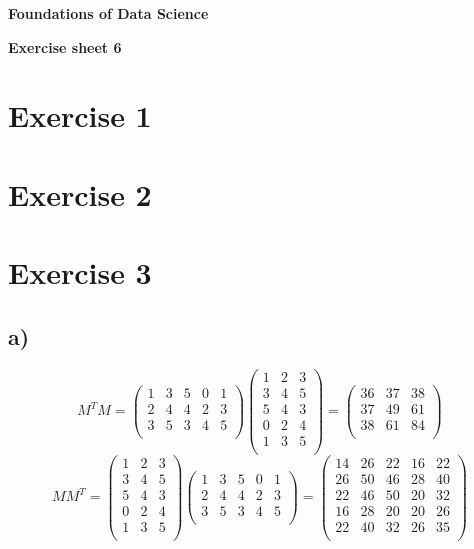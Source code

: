 \documentclass[a4paper,10pt]{article}
\begin{document}
\centerline{\Large\bfseries  Foundations of Data Science }
\centerline{\bfseries  Exercise sheet 6}
\section*{Exercise 1}
\section*{Exercise 2}
\section*{Exercise 3}
\subsection*{a)}

\[M^TM = \left( \begin{array}{ccccc}
1 & 3 & 5 & 0 & 1 \\
2 & 4 & 4 & 2 & 3 \\
3 & 5 & 3 & 4 & 5 \\
\end{array} \right)
%
\left( \begin{array}{ccccc}
1 & 2 & 3 \\
3 & 4 & 5 \\
5 & 4 & 3 \\
0 & 2 & 4 \\
1 & 3 & 5 \\
\end{array} \right)
=\left( \begin{array}{ccc}
36 & 37 & 38 \\
37 & 49 & 61 \\
38 & 61 & 84 \\
\end{array} \right)
\]
\[MM^T = 
\left( \begin{array}{ccccc}
1 & 2 & 3 \\
3 & 4 & 5 \\
5 & 4 & 3 \\
0 & 2 & 4 \\
1 & 3 & 5 \\
\end{array} \right) 
\left( \begin{array}{ccccc}
1 & 3 & 5 & 0 & 1 \\
2 & 4 & 4 & 2 & 3 \\
3 & 5 & 3 & 4 & 5 \\
\end{array} \right)
=
\left( \begin{array}{ccccc}
14 & 26 & 22 & 16 & 22 \\
26 & 50 & 46 & 28 & 40 \\
22 & 46 & 50 & 20 & 32 \\
16 & 28 & 20 & 20 & 26 \\
22 & 40 & 32 & 26 & 35 \\
\end{array} \right)
\]
\end{document}
